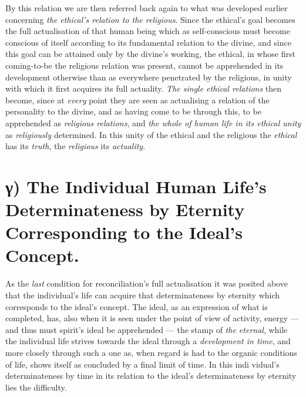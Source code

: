 \documentclass[12pt,a4paper]{book}
\begin{document}
By this relation we are then referred back again to what was developed earlier
concerning \emph{the ethical's relation to the religious}. Since the ethical's
goal becomes the full actualisation of that human being which as self-conscious
must become conscious of itself according to its fundamental relation to the
divine, and since this goal can be attained only by the divine's working, the
ethical, in whose first coming-to-be the religious relation was present, cannot
be apprehended in its development otherwise than as everywhere penetrated by the
religious, in unity with which it first acquires its full actuality. \emph{The
single ethical relations} then become, since at \emph{every} point they are seen
as actualising a relation of the personality to the divine, and as having come
to be through this, to be apprehended as \emph{religious relations}, and
\emph{the whole of human life in its ethical unity} as \emph{religiously}
determined. In this unity of the ethical and the religious the \emph{ethical}
has its \emph{truth}, the \emph{religious} its \emph{actuality}.

\section*{γ) The Individual Human Life's Determinateness by Eternity Corresponding to the Ideal's Concept.}

As the \emph{last} condition for reconciliation's full actualisation it was
posited above that the individual's life can acquire that determinateness by
eternity which corresponds to the ideal's concept. The ideal, as an expression
of what is completed, has, also when it is seen under the point of view of
activity, energy --- and thus must spirit's ideal be apprehended --- the stamp
of \emph{the eternal}, while the individual life strives towards the ideal
through a \emph{development in time}, and more closely through such a one as,
when regard is had to the organic conditions of life, shows itself as concluded
by a final limit of time. In this indi\-%
vidual's determinateness by time in its relation to the ideal's determinateness
by eternity lies the difficulty.
\end{document}
